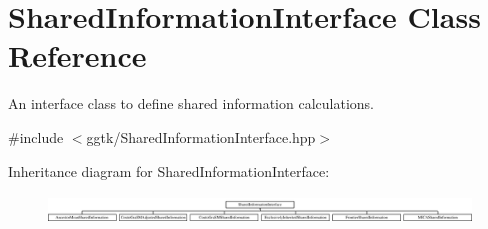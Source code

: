 \hypertarget{classSharedInformationInterface}{}\section{Shared\+Information\+Interface Class Reference}
\label{classSharedInformationInterface}


An interface class to define shared information calculations.  




{\ttfamily \#include $<$ggtk/\+Shared\+Information\+Interface.\+hpp$>$}

Inheritance diagram for Shared\+Information\+Interface\+:\begin{figure}[H]
\begin{center}
\leavevmode
\includegraphics[height=0.761905cm]{classSharedInformationInterface}
\end{center}
\end{figure}
